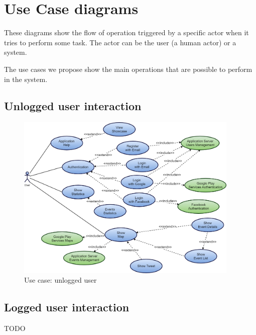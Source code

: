 \documentclass[a4paper]{scrreprt}
\begin{document}
\section{Use Case diagrams}
These diagrams show the flow of operation triggered by a specific actor when it tries to perform some task. The actor can be the user (a human actor) or a system.
\par The use cases we propose show the main operations that are possible to perform in the system.
\subsection{Unlogged user interaction}
\begin{figure}[H]
	\centering
	\includegraphics[width=0.95\textwidth]{diagrams/use_case/unlogged_user.png}
	\caption{Use case: unlogged user}
\end{figure}

\subsection{Logged user interaction}
TODO
\end{document}
